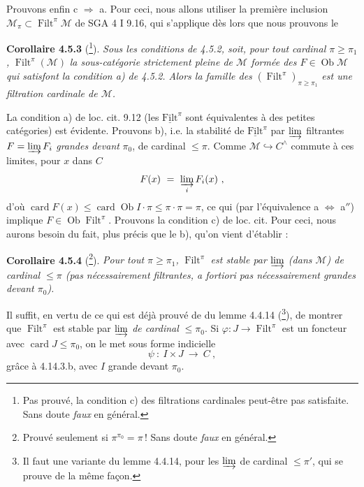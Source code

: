 \documentclass[11pt]{article}
\newcommand{\printedpage}[1]{\marginpar{\footnotesize p.~#1}}
\newcommand{\msp}[1]{\marginpar{\footnotesize [#1]}}
\newcommand{\card}{\operatorname{card}}
\newcommand{\Ob}{\operatorname{Ob}}
\newcommand{\Filt}{\operatorname{Filt}}
\newcommand{\uFilt}{\underline{\mathrm{Filt}}}
\begin{document}
Prouvons enfin c $\Longrightarrow$ a. Pour ceci, nous allons utiliser la première inclusion $\mathcal{M}_{\pi} \subset \Filt^{\pi}\mathcal{M}$ de SGA 4 I 9.16, qui s'applique dès lors que nous prouvons le

\textbf{Corollaire 4.5.3} (\footnote{Pas prouvé, la condition c) des filtrations cardinales peut-être pas satisfaite. Sans doute \textit{faux} en général.}). \textit{Sous les conditions de 4.5.2, soit, pour tout cardinal $\pi \geqslant \pi_1$,} $\Filt^{\pi}(\mathcal{M})$ \textit{la sous-catégorie strictement pleine de $\mathcal{M}$ formée des $F \in \Ob\mathcal{M}$ qui satisfont la condition a) de 4.5.2. Alors la famille des} $(\Filt^{\pi})_{\pi\geqslant\pi_1}$ \textit{est une}
\msp{page 110}
\textit{filtration cardinale de $\mathcal{M}$.}

La condition a) de loc. cit. 9.12 (les $\uFilt^{\pi}$ sont équivalentes à des petites catégories) est évidente. Prouvons b), i.e. la stabilité de $\uFilt^{\pi}$ par $\varinjlim$ filtrantes $F = \varinjlim F_i$ \textit{grandes devant} $\pi_0$, de cardinal $\leqslant \pi$. Comme $\mathcal{M} \hookrightarrow C^{\wedge}$ commute à ces limites, pour $x$ dans $C$
\[
F(x) \ =\ \varinjlim_{i} F_i(x)\ ,
\]
\printedpage{31}
d'où $\card F(x) \leqslant \card\Ob I \cdot \pi \leqslant \pi \cdot \pi = \pi$, ce qui (par l'équivalence a $\Longleftrightarrow$ a$''$) implique $F \in \Ob\Filt^{\pi}$. Prouvons la condition c) de loc. cit. Pour ceci, nous aurons besoin du fait, plus précis que le b), qu'on vient d'établir :

\textbf{Corollaire 4.5.4} (\footnote{Prouvé seulement si $\pi^{\pi_0} = \pi$\,! Sans doute \textit{faux} en général.}). \textit{Pour tout $\pi \geqslant \pi_1$,} $\Filt^{\pi}$ \textit{est stable par $\varinjlim$ (dans $\mathcal{M}$) de cardinal $\leqslant \pi$ (pas nécessairement filtrantes, a fortiori pas nécessairement grandes devant $\pi_0$).}

Il suffit, en vertu de ce qui est déjà prouvé de du lemme 4.4.14 (\footnote{Il faut une variante du lemme 4.4.14, pour les $\varinjlim$ de cardinal $\leqslant \pi'$, qui se prouve de la même façon.}), de montrer que $\Filt^{\pi}$ %
est stable par $\varinjlim$ \textit{de cardinal} $\leqslant \pi_0$. Si $\varphi : J \longrightarrow \Filt^{\pi}$ est un foncteur avec $\card J \leqslant \pi_0$, on le met sous forme indicielle
\[
\psi\ :\ I \times J \ \longrightarrow\ C\ ,
\]
grâce à 4.14.3.b, avec $I$ grande devant $\pi_0$.
\end{document}
